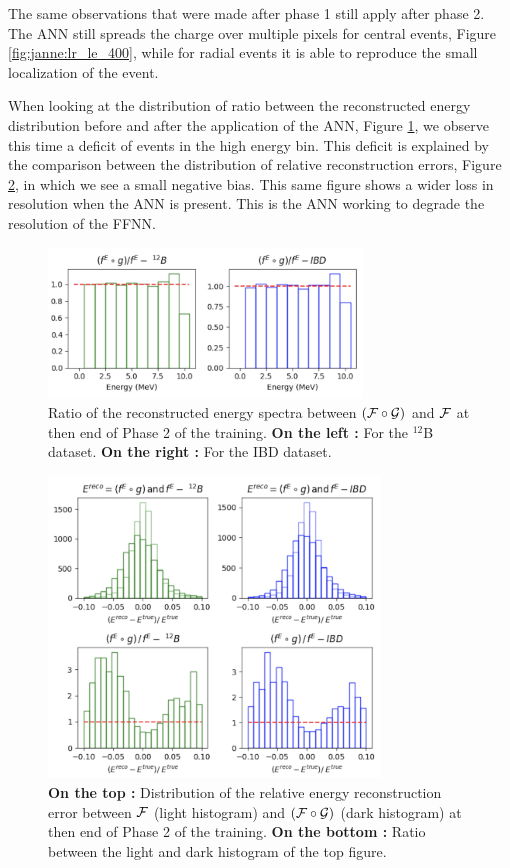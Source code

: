 \documentclass[../main.tex]{subfiles}
\begin{document}
The same observations that were made after phase 1 still apply after phase 2. The ANN still spreads the charge over multiple pixels for central events, Figure \ref{fig:janne:lr_le_400}, while for radial events it is able to reproduce the small localization of the event.

When looking at the distribution of ratio between the reconstructed energy distribution before and after the application of the ANN, Figure \ref{fig:janne:f_circ_over_f_400}, we observe this time a deficit of events in the high energy bin. This deficit is explained by the comparison between the distribution of relative reconstruction errors, Figure \ref{fig:janne:rec_err_400}, in which we see a small negative bias. This same figure shows a wider loss in resolution when the ANN is present. This is the ANN working to degrade the resolution of the FFNN.

\begin{figure}[!ht]
  \centering
  \includegraphics[height=4cm]{images/janne/f_circ_over_f_400.png}
  \caption{Ratio of the reconstructed energy spectra between $({\cal F} \circ {\cal G})$ and ${\cal F}$ at then end of Phase 2 of the training. \textbf{On the left :} For the $^{12}$B dataset. \textbf{On the right :} For the IBD dataset.}
  \label{fig:janne:f_circ_over_f_400}
\end{figure}

\begin{figure}[!ht]
  \centering
  \includegraphics[height=8cm]{images/janne/rec_err_400.png}
  \caption{\textbf{On the top :} Distribution of the relative energy reconstruction error between ${\cal F}$ (light histogram) and $({\cal F} \circ {\cal G})$ (dark histogram) at then end of Phase 2 of the training. \textbf{On the bottom :} Ratio between the light and dark histogram of the top figure.}
  \label{fig:janne:rec_err_400}
\end{figure}
\end{document}
